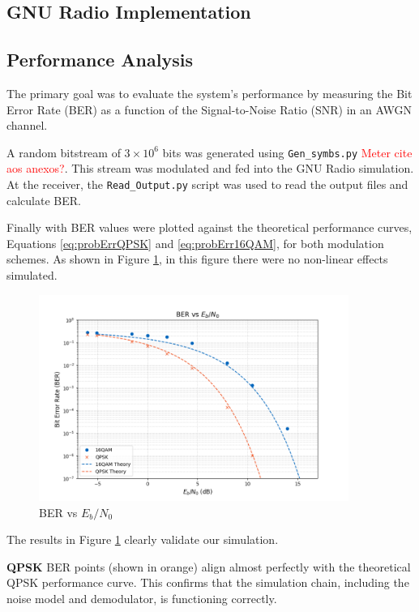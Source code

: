\subsection{GNU Radio Implementation}


\subsection{Performance Analysis}

The primary goal was to evaluate the system's performance by measuring the Bit Error Rate (BER) as a function of the Signal-to-Noise Ratio (SNR) in an AWGN channel.

A random bitstream of $3 \times 10^6$ bits was generated using \texttt{Gen\_symbs.py} \textcolor{red}{Meter cite aos anexos?}. This stream was modulated and fed into the GNU Radio simulation. At the receiver, the \texttt{Read\_Output.py} script was used to read the output files and calculate BER.

Finally with BER values were plotted against the theoretical performance curves, Equations \ref{eq:probErrQPSK} and \ref{eq:probErr16QAM}, for both modulation schemes. As shown in Figure \ref{fig:BER_SNR_a3_0}, in this figure there were no non-linear effects simulated.

\begin{figure}[H]
    \centering
    \includegraphics*[width=0.9\textwidth]{Images/BER_SNR_a3_0.png}
    \caption{BER vs $E_b/N_0$}
    \label{fig:BER_SNR_a3_0}
\end{figure}

The results in Figure \ref{fig:BER_SNR_a3_0} clearly validate our simulation.

\textbf{QPSK} BER points (shown in orange) align almost perfectly with the theoretical QPSK performance curve. This confirms that the simulation chain, including the noise model and demodulator, is functioning correctly.

